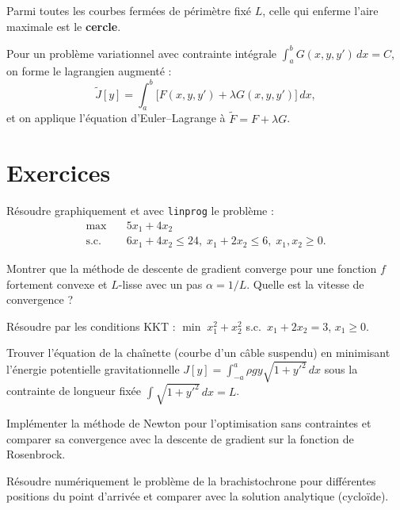 \begin{theoreme}
Parmi toutes les courbes ferm\'ees de p\'erim\`etre fix\'e $L$,
celle qui enferme l'aire maximale est le \textbf{cercle}.
\end{theoreme}

\begin{definition}
Pour un probl\`eme variationnel avec contrainte int\'egrale
$\int_a^b G(x,y,y')\,dx = C$, on forme le lagrangien augment\'e :
\[
  \tilde{J}[y] = \int_a^b \bigl[F(x,y,y') + \lambda G(x,y,y')\bigr]\,dx,
\]
et on applique l'\'equation d'Euler--Lagrange \`a $\tilde{F}=F+\lambda G$.
\end{definition}

\section{Exercices}

\begin{exercice}
R\'esoudre graphiquement et avec \texttt{linprog} le probl\`eme :
\begin{align*}
  \max\quad & 5x_1 + 4x_2 \\
  \text{s.c.}\quad & 6x_1+4x_2\leq 24,\; x_1+2x_2\leq 6,\;
  x_1,x_2\geq 0.
\end{align*}
\end{exercice}

\begin{exercice}
Montrer que la m\'ethode de descente de gradient converge pour une
fonction $f$ fortement convexe et $L$-lisse avec un pas
$\alpha=1/L$.  Quelle est la vitesse de convergence ?
\end{exercice}

\begin{exercice}
R\'esoudre par les conditions KKT :
$\min\;x_1^2+x_2^2$ s.c.\ $x_1+2x_2=3$, $x_1\geq 0$.
\end{exercice}

\begin{exercice}
Trouver l'\'equation de la cha\^inette (courbe d'un c\^able
suspendu) en minimisant l'\'energie potentielle gravitationnelle
$J[y]=\int_{-a}^{a}\rho g y\sqrt{1+y'^2}\,dx$ sous la contrainte
de longueur fix\'ee $\int\sqrt{1+y'^2}\,dx=L$.
\end{exercice}

\begin{exercice}
Impl\'ementer la m\'ethode de Newton pour l'optimisation sans
contraintes et comparer sa convergence avec la descente de gradient
sur la fonction de Rosenbrock.
\end{exercice}

\begin{exercice}
R\'esoudre num\'eriquement le probl\`eme de la brachistochrone pour
diff\'erentes positions du point d'arriv\'ee et comparer avec la
solution analytique (cyclo\"ide).
\end{exercice}
